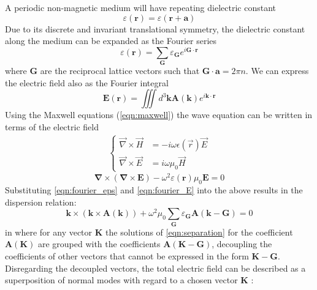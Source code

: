 A periodic non-magnetic medium will have repeating dielectric constant \cite{yariv}
\begin{equation}
	\varepsilon(\boldsymbol{r}) = \varepsilon(\boldsymbol{r}+\boldsymbol{a})
\end{equation}
Due to its discrete and invariant translational symmetry, the dielectric constant along the medium can be expanded as the Fourier series
\begin{equation}
	\varepsilon(\boldsymbol{r}) = \sum_{\boldsymbol{G}}\varepsilon_{\boldsymbol{G}}e^{i\boldsymbol{G}\cdot\boldsymbol{r}}
	\label{eqn:fourier_eps}
\end{equation}
where $\boldsymbol{G}$ are the reciprocal lattice vectors such that $\boldsymbol{G}\cdot\boldsymbol{a} = 2\pi n$. We can express the electric field also as the Fourier integral
\begin{equation}
	\boldsymbol{E}(\boldsymbol{r}) = \iiint d^3\boldsymbol{k}\boldsymbol{A}(\boldsymbol{k})e^{i\boldsymbol{k}\cdot\boldsymbol{r}}
	\label{eqn:fourier_E}
\end{equation}
Using the Maxwell equations (\ref{eqn:maxwell}) the wave equation can be written in terms of the electric field
\begin{equation}
	\begin{aligned}
		\begin{cases}
			\vec{\nabla}\times\vec{H} & = -i\omega\epsilon(\vec{r})\vec{E} \\
			\vec{\nabla}\times\vec{E} & = i\omega\mu_0\vec{H}
		\end{cases}
	\end{aligned}
	\label{eqn:maxwell}
\end{equation}
\begin{equation}
	\boldsymbol{\nabla}\times(\boldsymbol{\nabla}\times\boldsymbol{E})-\omega^2\varepsilon(\boldsymbol{r})\mu_0\boldsymbol{E} = 0
\end{equation}
Substituting \eqref{eqn:fourier_eps} and \eqref{eqn:fourier_E} into the above results in the dispersion relation:
\begin{equation}
	\boldsymbol{k}\times(\boldsymbol{k}\times\boldsymbol{A}(\boldsymbol{k})) + \omega^2\mu_0\sum_{\boldsymbol{G}}\varepsilon_{\boldsymbol{G}}\boldsymbol{A}(\boldsymbol{k}-\boldsymbol{G}) = 0
	\label{eqn:separation}
\end{equation}
in where for any vector $\boldsymbol{K}$ the solutions of \eqref{eqn:separation} for the coefficient $\boldsymbol{A}(\boldsymbol{K})$ are grouped with the coefficients $\boldsymbol{A}(\boldsymbol{K}-\boldsymbol{G})$, decoupling the coefficients of other vectors that cannot be expressed in the form $\boldsymbol{K}-\boldsymbol{G}$. Disregarding the decoupled vectors, the total electric field can be described as a superposition of normal modes with regard to a chosen vector $\boldsymbol{K}$ :
